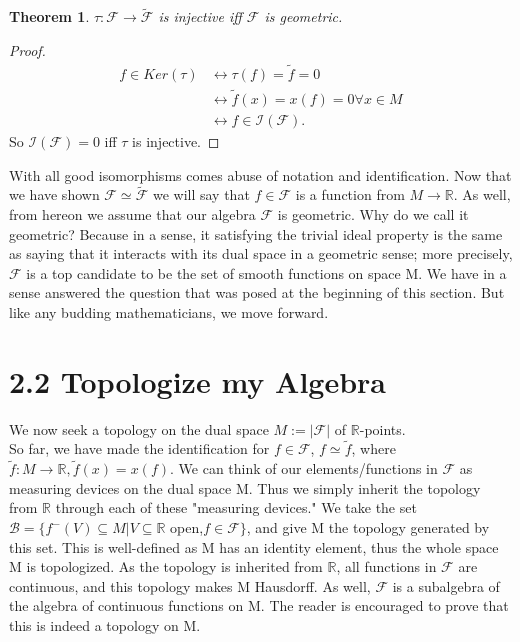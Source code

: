 \documentclass[12pt]{extarticle}
\newcommand\Reals{{\mathbb{R}}}
\newcommand{\ff}{\mathcal{F}}
\newtheorem{theorem}{Theorem}
\begin{document}
\begin{theorem}
$\tau:\ff\to\tilde{\ff}$ is injective iff $\ff$ is geometric.
\end{theorem}
\begin{proof}
\begin{align*}
f\in Ker(\tau) & \leftrightarrow \tau(f) = \tilde{f} = 0 \\
& \leftrightarrow \tilde{f}(x) = x(f) = 0 \forall x\in M \\
& \leftrightarrow f\in \mathcal{I}(\ff).
\end{align*}
So $\mathcal{I}(\ff) = 0$ iff $\tau$ is injective.
\end{proof}

With all good isomorphisms comes abuse of notation and identification. Now that we have shown $\ff\simeq\tilde{\ff}$ we will say that $f\in\ff$ is a function from $M\to\Reals$. As well, from hereon we assume that our algebra $\ff$ is geometric. Why do we call it geometric? Because in a sense, it satisfying the trivial ideal property is the same as saying that it interacts with its dual space in a geometric sense; more precisely, $\ff$ is a top candidate to be the set of smooth functions on space M. We have in a sense answered the question that was posed at the beginning of this section. But like any budding mathematicians, we move forward.

\section*{2.2 Topologize my Algebra}
We now seek a topology on the dual space $M := |\ff|$ of $\Reals$-points.\\
So far, we have made the identification for $f\in\ff$, $f\simeq\tilde{f}$, where $\tilde{f}: M\to\Reals, \tilde{f}(x) = x(f)$. We can think of our elements/functions in $\ff$ as measuring devices on the dual space M. Thus we simply inherit the topology from $\Reals$ through each of these "measuring devices." We take the set $\mathcal{B} = \{f^-(V)\subseteq M|V\subseteq\Reals$ open,$f\in\ff\}$, and give M the topology generated by this set. This is well-defined as M has an identity element, thus the whole space M is topologized. As the topology is inherited from $\Reals$, all functions in $\ff$ are continuous, and this topology makes M Hausdorff. As well, $\ff$ is a subalgebra of the algebra of continuous functions on M. The reader is encouraged to prove that this is indeed a topology on M.
\end{document}
